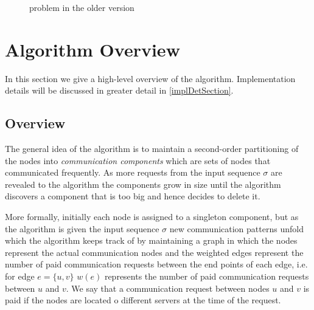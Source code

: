 \documentclass[a4paper,xcolor=dvipsnames, tikz, 12pt]{article}
\newcommand{\request}[3]{\draw (axis cs:#3,#1) -- node[left]{} (axis cs:#3,#2);}
\theoremstyle{definition}
\begin{document}
\begin{figure}
	\caption{problem in the older version}\label{exOldCrep}
	
\end{figure}
	
	
	
	\section{Algorithm Overview}
	In this section we give a high-level overview of the algorithm. Implementation details will be discussed in greater detail in \cref{implDetSection}.
	
	\subsection{Overview}
	The general idea of the algorithm is to maintain a second-order partitioning of the nodes into \textit{communication components} which are sets of nodes that communicated frequently. As more requests from the input sequence $\sigma$ are revealed to the algorithm the components grow in size until the algorithm discovers a component that is too big and hence decides to delete it.
	
	More formally, initially each node is assigned to a singleton component, but as the algorithm is given the input sequence $\sigma$ new communication patterns unfold which the algorithm keeps track of by maintaining a graph in which the nodes represent the actual communication nodes and the weighted edges represent the number of paid communication requests between the end points of each edge, i.e. for edge $e=\{u,v\}$ $w(e)$ represents the number of paid communication requests between $u$ and $v$. We say that a communication request between nodes $u$ and $v$ is paid if the nodes are located o different servers at the time of the request.
	
\end{document}
